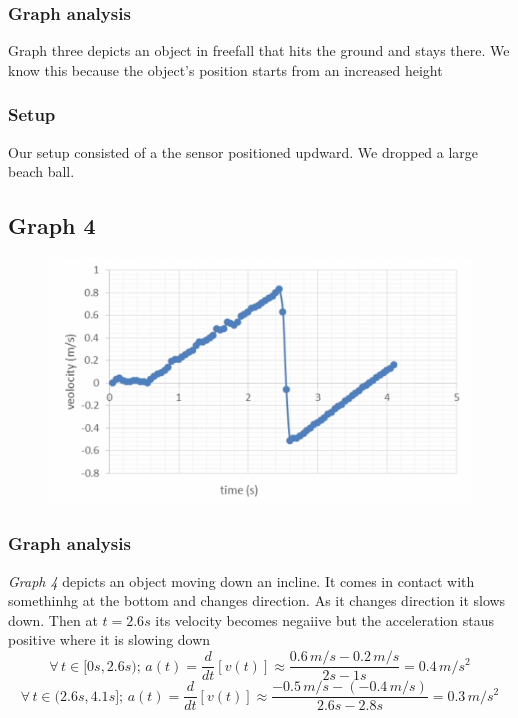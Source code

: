 \documentclass[11pt, letterpaper, includehead]{article}
\begin{document}
  \subsubsection{Graph analysis}
  Graph three depicts an object in freefall that hits the ground and stays there. We know this because the
  object's position starts from an increased height\\
  
  \subsubsection{Setup}
  Our setup consisted of a the sensor positioned updward. We dropped a large beach ball.\\

  \subsection{Graph 4}

  \begin{figure}[H] %
    \centering 
    \includegraphics[width=\linewidth]{graph_4.png}
  \end{figure}

  \subsubsection{Graph analysis}
  \emph{Graph 4} depicts an object moving down an incline. It comes in contact with somethinhg at the
  bottom and changes direction. As it changes direction it slows down. Then at $t=2.6s$ its velocity 
  becomes negaiive but the acceleration staus positive where it is slowing down\\
  $$\forall \, t \in [0s, 2.6s); \, a(t) = \frac{d}{dt}[v(t)] \approx \frac{0.6 \, m/s - 0.2 \, m/s}{2s - 1s} = 0.4 \, m/s^2$$
  $$\forall \, t \in (2.6s, 4.1s]; \, a(t) = \frac{d}{dt}[v(t)] \approx \frac{-0.5 \, m/s -(-0.4 \, m/s)}{2.6s - 2.8s} = 0.3 \, m/s^2$$ %
  
\end{document}
